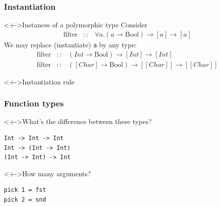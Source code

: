 \documentclass{beamer}
\begin{document}
\begin{frame}
  \frametitle{Instantiation}
  \begin{block}<+->{Instances of a polymorphic type}
    Consider
    \begin{eqnarray*}
      \text{filter} & :: & \forall a. (a \to \text{Bool}) \to [a] \to [a]
    \end{eqnarray*}
    We may replace (instantiate) \texttt{a} by any type:
    \begin{eqnarray*}
      \text{filter} & :: & (Int \to \text{Bool}) \to [Int] \to [Int] \\
      \text{filter} & :: & ([Char] \to \text{Bool}) \to [[Char]] \to [[Char]]
    \end{eqnarray*}
  \end{block}
  \begin{block}<+->{Instantiation rule}
    \begin{mathpar}
    \end{mathpar}
  \end{block}
\end{frame}
\begin{frame}[fragile]
  \frametitle{Function types}
  \begin{block}<+->{What's the difference between these types?}
\begin{verbatim}
Int -> Int -> Int
Int -> (Int -> Int)
(Int -> Int) -> Int
\end{verbatim}
  \end{block}
  \begin{block}<+->{How many arguments?}
\begin{verbatim}
pick 1 = fst
pick 2 = snd
\end{verbatim}
  \end{block}  
\end{frame}
\end{document}
